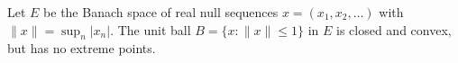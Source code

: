 Let $E$ be the Banach space of real null sequences $x = (x_1, x_2, \ldots)$ with $\|x\| = \sup_n |x_n|$.
The unit ball $B = \{ x : \|x\| \leq 1 \}$ in $E$ is closed and convex, but has no extreme points.
